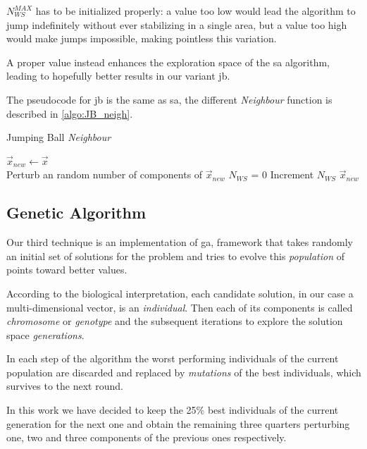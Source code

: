\documentclass[12pt,journal,draftclsnofoot,onecolumn]{IEEEtran}
\begin{document}
$N_{WS}^{MAX}$ has to be initialized properly: a value too low would lead the algorithm to jump indefinitely without ever stabilizing in a single area, but a value too high would make jumps impossible, making pointless this variation.

A proper value instead enhances the exploration space of the \gls{sa} algorithm, leading to hopefully better results in our variant \gls{jb}.

The pseudocode for \gls{jb} is the same as \gls{sa}, the different \emph{Neighbour} function is described in \autoref{algo:JB_neigh}.

\begin{algorithm}
	\caption{Jumping Ball \emph{Neighbour}}\label{algo:JB_neigh}
	 {
		$\vec{x}_{new} \gets \vec{x}$ \\
		 {
			 {
				Perturb an random number of components of $\vec{x}_{new}$
			}
			$N_{WS}$ = 0
		}
	}
	 {
		Increment $N_{WS}$
	}
	\Return $\vec{x}_{new}$
\end{algorithm}

\subsection{Genetic Algorithm}

Our third technique is an implementation of \gls{ga}, framework that takes randomly an initial set of solutions for the problem and tries to evolve this \emph{population} of points toward better values.

According to the biological interpretation, each candidate solution, in our case a multi-dimensional vector, is an \emph{individual}.
Then each of its components is called \emph{chromosome} or \emph{genotype} and the subsequent iterations to explore the solution space \emph{generations}.

In each step of the algorithm the worst performing individuals of the current population are discarded and replaced by \emph{mutations} of the best individuals, which survives to the next round.

In this work we have decided to keep the 25\% best individuals of the current generation for the next one and obtain the remaining three quarters perturbing one, two and three components of the previous ones respectively.
\end{document}
